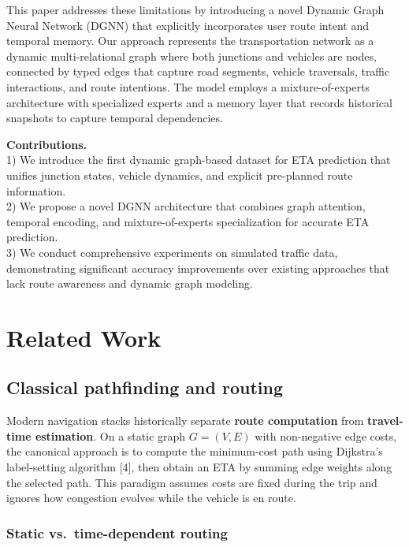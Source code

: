 \documentclass[
  10pt,
  letterpaper,
  lettersize,
  journal]{IEEEtran}
\begin{document}
This paper addresses these limitations by introducing a novel Dynamic
Graph Neural Network (DGNN) that explicitly incorporates user route
intent and temporal memory. Our approach represents the transportation
network as a dynamic multi-relational graph where both junctions and
vehicles are nodes, connected by typed edges that capture road segments,
vehicle traversals, traffic interactions, and route intentions. The
model employs a mixture-of-experts architecture with specialized experts
and a memory layer that records historical snapshots to capture temporal
dependencies.

\textbf{Contributions.}\\
1) We introduce the first dynamic graph-based dataset for ETA prediction
that unifies junction states, vehicle dynamics, and explicit pre-planned
route information.\\
2) We propose a novel DGNN architecture that combines graph attention,
temporal encoding, and mixture-of-experts specialization for accurate
ETA prediction.\\
3) We conduct comprehensive experiments on simulated traffic data,
demonstrating significant accuracy improvements over existing approaches
that lack route awareness and dynamic graph modeling.

\section{Related Work}\label{related-work}

\subsection{Classical pathfinding and
routing}\label{classical-pathfinding-and-routing}

Modern navigation stacks historically separate \textbf{route
computation} from \textbf{travel-time estimation}. On a static graph
\(G=(V,E)\) with non-negative edge costs, the canonical approach is to
compute the minimum-cost path using Dijkstra's label-setting algorithm
{[}4{]}, then obtain an ETA by summing edge weights along the selected
path. This paradigm assumes costs are fixed during the trip and ignores
how congestion evolves while the vehicle is en route.

\subsubsection{Static vs.~time-dependent
routing}\label{static-vs.-time-dependent-routing}
\end{document}
